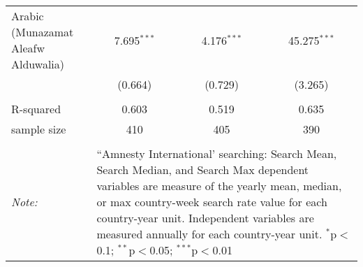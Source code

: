 \begin{table}[!htbp]
\begin{tabular}{@{\extracolsep{5pt}}lccc}
  Arabic (Munazamat Aleafw Alduwalia) & 7.695$^{***}$ & 4.176$^{***}$ & 45.275$^{***}$ \\ 
  & (0.664) & (0.729) & (3.265) \\ 
 \hline \\[-1.8ex] 
R-squared  & 0.603 & 0.519 & 0.635 \\ 
sample size  & 410 & 405 & 390 \\ 
\hline 
\hline \\[-1.8ex] 
\textit{Note:}  & \multicolumn{3}{l}{\parbox[t]{8cm}{``Amnesty International' searching: Search Mean, Search Median, and Search Max dependent variables are measure of the yearly mean, median, or max country-week search rate value for each country-year unit. Independent variables are measured annually for each country-year unit. $^{*}$p$<$0.1; $^{**}$p$<$0.05; $^{***}$p$<$0.01}} \\ 
\end{tabular} 
\end{table} 
